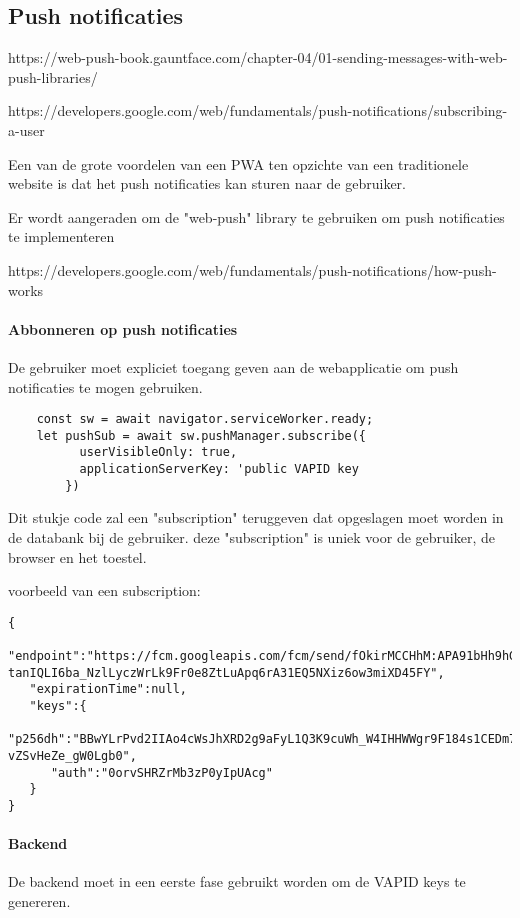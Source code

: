 	\subsection{Push notificaties}
	
	https://web-push-book.gauntface.com/chapter-04/01-sending-messages-with-web-push-libraries/
	
	https://developers.google.com/web/fundamentals/push-notifications/subscribing-a-user
	
		Een van de grote voordelen van een PWA ten opzichte van een traditionele website is dat het push notificaties kan sturen naar de gebruiker.
		
		Er wordt aangeraden om de "web-push" library te gebruiken om push notificaties te implementeren
		
		https://developers.google.com/web/fundamentals/push-notifications/how-push-works
		
		\paragraph{Abbonneren op push notificaties}
			 De gebruiker moet expliciet toegang geven aan de webapplicatie om push notificaties te mogen gebruiken.
			 
\begin{lstlisting}
    const sw = await navigator.serviceWorker.ready;
    let pushSub = await sw.pushManager.subscribe({
          userVisibleOnly: true,
          applicationServerKey: 'public VAPID key
        })
\end{lstlisting}

			Dit stukje code zal een "subscription" teruggeven dat opgeslagen moet worden in de databank bij de gebruiker. deze "subscription" is uniek voor de gebruiker, de browser en het toestel.
			
			voorbeeld van een subscription:
	
\begin{lstlisting}
{
   "endpoint":"https://fcm.googleapis.com/fcm/send/fOkirMCCHhM:APA91bHh9hG2XiqzvG3w4fhcRUDOlUSAIRwdhyhUEmoiO9CXRjV5LaCrLKvpoyhU8j7KdTqHN6jHLe_I-tanIQLI6ba_NzlLyczWrLk9Fr0e8ZtLuApq6rA31EQ5NXiz6ow3miXD45FY",
   "expirationTime":null,
   "keys":{
      "p256dh":"BBwYLrPvd2IIAo4cWsJhXRD2g9aFyL1Q3K9cuWh_W4IHHWWgr9F184s1CEDm7CgcB6Zg3E-vZSvHeZe_gW0Lgb0",
      "auth":"0orvSHRZrMb3zP0yIpUAcg"
   }
}
\end{lstlisting}


		\paragraph{Backend}
			De backend moet in een eerste fase gebruikt worden om de VAPID keys te genereren.
			
